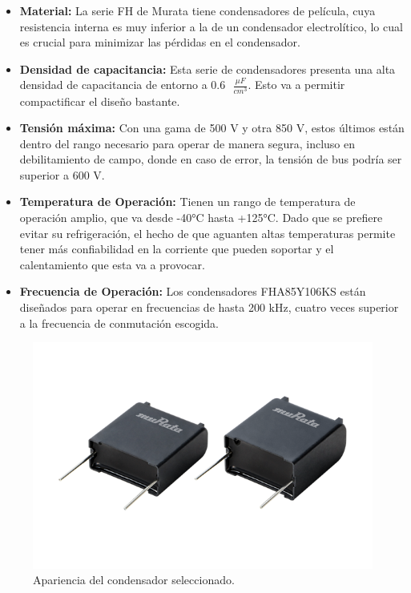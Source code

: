 \begin{itemize}
	\item \textbf{Material:} La serie FH de Murata tiene condensadores de película, cuya resistencia interna es muy inferior a la de un condensador electrolítico, lo cual es crucial para minimizar las pérdidas en el condensador.
	
	\item \textbf{Densidad de capacitancia:} Esta serie de condensadores presenta una alta densidad de capacitancia de entorno a $0.6\text{ }\frac{\mu F}{cm^3}$. Esto va a permitir compactificar el diseño bastante.
	
	\item \textbf{Tensión máxima:} Con una gama de 500 V y otra 850 V, estos últimos están dentro del rango necesario para operar de manera segura, incluso en debilitamiento de campo, donde en caso de error, la tensión de bus podría ser superior a 600 V.
	
	\item \textbf{Temperatura de Operación:} Tienen un rango de temperatura de operación amplio, que va desde -40°C hasta +125°C. Dado que se prefiere evitar su refrigeración, el hecho de que aguanten altas temperaturas permite tener más confiabilidad en la corriente que pueden soportar y el calentamiento que esta va a provocar.
	
	\item \textbf{Frecuencia de Operación:} Los condensadores FHA85Y106KS están diseñados para operar en frecuencias de hasta 200 kHz, cuatro veces superior a la frecuencia de conmutación escogida.
	
	
\end{itemize}

\begin{figure}[H]
	\centering
	\includegraphics[width=0.7\linewidth]{fig/FHA85Y106KS}
	\caption{Apariencia del condensador seleccionado.}
\end{figure}



